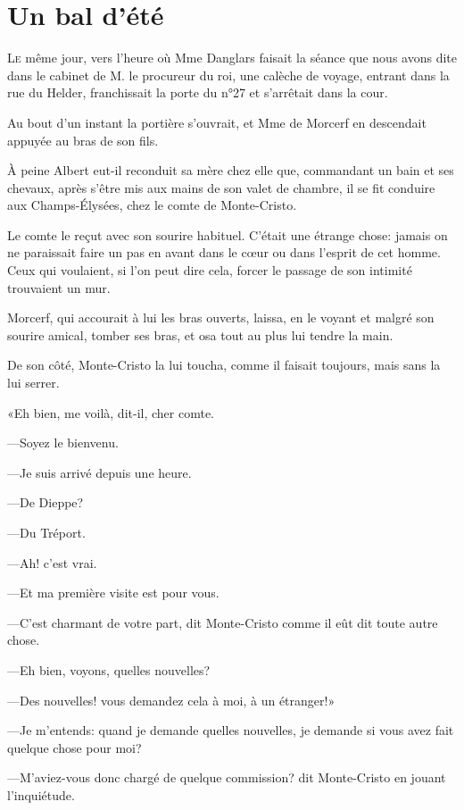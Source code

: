 \chapter{Un bal d'été}

\lettrine{L}{e} même jour, vers l'heure où Mme Danglars faisait la séance que nous avons dite dans le cabinet de M. le procureur du roi, une calèche de voyage, entrant dans la rue du Helder, franchissait la porte du n°27 et s'arrêtait dans la cour. 

Au bout d'un instant la portière s'ouvrait, et Mme de Morcerf en descendait appuyée au bras de son fils. 

À peine Albert eut-il reconduit sa mère chez elle que, commandant un bain et ses chevaux, après s'être mis aux mains de son valet de chambre, il se fit conduire aux Champs-Élysées, chez le comte de Monte-Cristo. 

Le comte le reçut avec son sourire habituel. C'était une étrange chose: jamais on ne paraissait faire un pas en avant dans le cœur ou dans l'esprit de cet homme. Ceux qui voulaient, si l'on peut dire cela, forcer le passage de son intimité trouvaient un mur. 

Morcerf, qui accourait à lui les bras ouverts, laissa, en le voyant et malgré son sourire amical, tomber ses bras, et osa tout au plus lui tendre la main.  

De son côté, Monte-Cristo la lui toucha, comme il faisait toujours, mais sans la lui serrer. 

«Eh bien, me voilà, dit-il, cher comte. 

—Soyez le bienvenu. 

—Je suis arrivé depuis une heure. 

—De Dieppe? 

—Du Tréport. 

—Ah! c'est vrai. 

—Et ma première visite est pour vous. 

—C'est charmant de votre part, dit Monte-Cristo comme il eût dit toute autre chose. 

—Eh bien, voyons, quelles nouvelles? 

—Des nouvelles! vous demandez cela à moi, à un étranger!» 

—Je m'entends: quand je demande quelles nouvelles, je demande si vous avez fait quelque chose pour moi? 

—M'aviez-vous donc chargé de quelque commission? dit Monte-Cristo en jouant l'inquiétude. 

